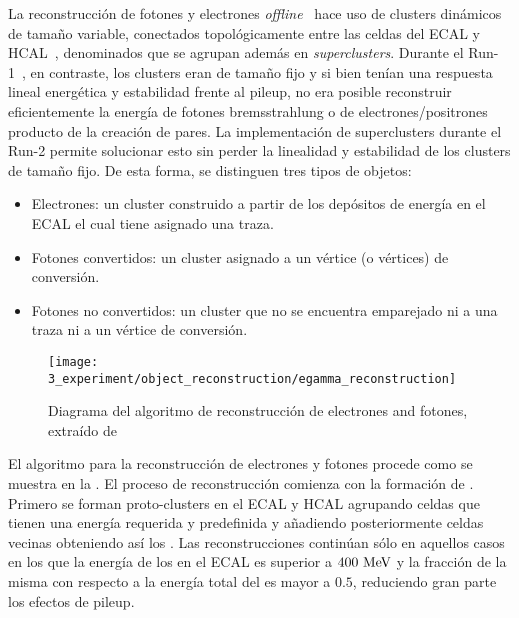 La reconstrucción de fotones y electrones \textit{offline}~\cite{ATLAS-EGamma-Performance-2015-2017,ATLAS-TopoClusters-Run2} hace uso de clusters dinámicos de tamaño variable, conectados topológicamente entre las celdas del \ac{ECAL} y \ac{HCAL}~\cite{ATLAS-TopoClusters-Run1}, denominados \textit{\topos} que se agrupan además en \textit{superclusters}. 
Durante el Run-1~\cite{ATLAS-EGamma-Performance-Run1, ATLAS-EGamma-CalibrationPerformance-Run1, ATLAS-CalorimeterClustering-2008}, en contraste, los clusters eran de tamaño fijo y si bien tenían una respuesta lineal energética y estabilidad frente al pileup, no era posible reconstruir eficientemente la energía de fotones bremsstrahlung o de electrones/positrones producto de la creación de pares. La implementación de superclusters durante el Run-2
permite solucionar esto sin perder la linealidad y estabilidad de los clusters de tamaño fijo.
De esta forma, se distinguen tres tipos de objetos:
\begin{itemize}
    \item Electrones: un cluster construido a partir de los depósitos de energía en el \ac{ECAL} el cual tiene asignado una traza.
    \item Fotones convertidos: un cluster asignado a un vértice (o vértices) de conversión.
    \item Fotones no convertidos: un cluster que no se encuentra emparejado ni a una traza ni a un vértice de conversión.
\end{itemize}

\begin{figure}[ht!]
    \centering
    \texttt{[image: 3\_experiment/object\_reconstruction/egamma\_reconstruction]}
    \caption{Diagrama del algoritmo de reconstrucción de electrones and fotones, extraído de }
    \label{fig:objects:egamma:reco:reco_diagram}
\end{figure}

El algoritmo para la reconstrucción de electrones y fotones procede como se muestra en la \Fig{\ref{fig:objects:egamma:reco:reco_diagram}}.
El proceso de reconstrucción comienza con la formación de \topos. Primero se forman proto-clusters en el \ac{ECAL} y \ac{HCAL} agrupando celdas que tienen una energía requerida y predefinida y añadiendo posteriormente celdas vecinas obteniendo así los \topos. Las reconstrucciones continúan sólo en aquellos casos en los que la energía de los \topos en el \ac{ECAL} es superior a \(400~\text{MeV}\) y la fracción de la misma con respecto a la energía total del \topo es mayor a \(0.5\), reduciendo gran parte los efectos de pileup.


